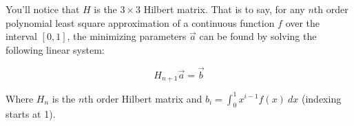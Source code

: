 \documentclass{article}
\begin{document}
You'll notice that $H$ is the $3\times3$ Hilbert matrix. That is to say, for any $n$th order polynomial least square approximation of a continuous function $f$ over the interval $[0,1]$, the minimizing parameters $\vec a$ can be found by solving the following linear system:

$$H_{n+1}\vec a=\vec b$$

Where $H_n$ is the $n$th order Hilbert matrix and $b_i=\int_0^1x^{i-1}f(x)\ dx$ (indexing starts at 1).
\end{document}
